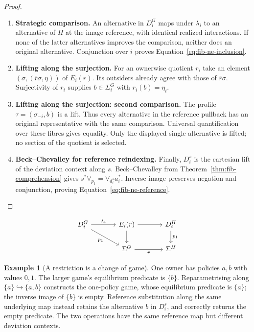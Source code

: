 \documentclass[11pt,a4paper]{article}
\numberwithin{equation}{section}
\theoremstyle{definition}
\newtheorem{example}[theorem]{Example}
\theoremstyle{remark}
\theoremstyle{plain}
\begin{document}
\begin{proof}
\leavevmode
\begin{enumerate}[label=\textup{(\arabic*)},leftmargin=*,itemsep=4pt,topsep=3pt]
  \item \textbf{Strategic comparison.} An alternative in $D_i^G$ maps under $\lambda_i$ to an alternative of
$H$ at the image reference, with identical realized interactions. If none of the latter alternatives improves the comparison, neither
does an original alternative. Conjunction over $i$ proves
Equation~\eqref{eq:fib-ne-inclusion}.
  \item \textbf{Lifting along the surjection.} For an ownerwise quotient $r$, take an element
$(\sigma,(\bar r\sigma,\eta))$ of $E_i(r)$. Its outsiders already
agree with those of $\bar r\sigma$. Surjectivity of $r_i$ supplies
$b\in\Sigma_i^G$ with $r_i(b)=\eta_i$.
  \item \textbf{Lifting along the surjection: second comparison.} The profile
$\tau=(\sigma_{-i},b)$ is a lift. Thus every alternative in the
reference pullback has an original representative with the same
comparison. Universal quantification over these fibres gives equality. Only the displayed single alternative is lifted; no section of the
quotient is selected.
  \item \textbf{Beck--Chevalley for reference reindexing.} Finally, $D_i^s$ is the cartesian lift of the deviation context along
$s$. Beck--Chevalley from Theorem~\ref{thm:fib-comprehension} gives
$s^*\forall_{p_1}=\forall_{d_i^s}a_i^*$. Inverse image preserves
negation and conjunction, proving Equation~\eqref{eq:fib-ne-reference}.
\end{enumerate}
\end{proof}


\[
\begin{tikzcd}[column sep=large]
 D_i^G\arrow[r,"\lambda_i"]\arrow[dr,"p_1"']&
 E_i(r)\arrow[d]\arrow[r]&D_i^H\arrow[d,"p_1"]\\
 &\Sigma^G\arrow[r,"\bar r"']&\Sigma^H
\end{tikzcd}
\]

\begin{example}[A restriction is a change of game]
One owner has policies $a,b$ with values $0,1$. The larger game's
equilibrium predicate is $\{b\}$. Reparametrising along
$\{a\}\hookrightarrow\{a,b\}$ constructs the one-policy game,
whose equilibrium predicate is $\{a\}$; the inverse image of
$\{b\}$ is empty. Reference substitution along the same underlying
map instead retains the alternative $b$ in $D_i^s$, and correctly
returns the empty predicate. The two operations have the same reference
map but different deviation contexts.
\end{example}
\end{document}
